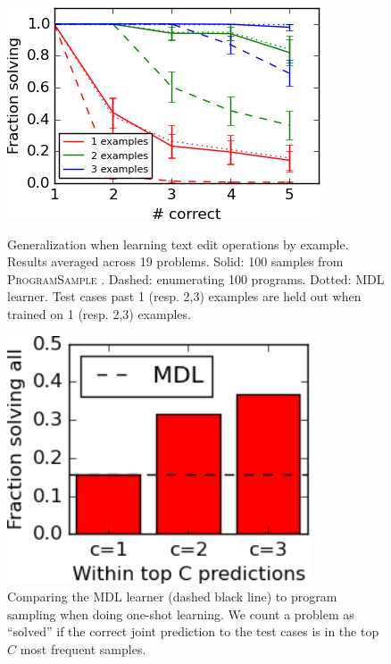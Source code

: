 \documentclass{article}
\newcommand{\theSystem}{\textsc{ProgramSample}}
\begin{document}
\begin{figure}\centering
  \begin{minipage}{0.45\textwidth}
    \includegraphics[width=\textwidth]{smallFractionSolving.png}
  \caption{Generalization when learning text edit operations by example. Results averaged across 19 problems. Solid: 100 samples from \theSystem{} . Dashed: enumerating 100 programs. Dotted: MDL learner. Test cases past 1 (resp. 2,3) examples are held out when trained on 1 (resp. 2,3) examples.}\label{flashPerformance}        \end{minipage}%
\hspace{0.1\textwidth}\begin{minipage}{0.45\textwidth}\centering
    \includegraphics[width=0.8\textwidth]{small_mdl.png}
    \caption{Comparing the MDL learner (dashed black line) to program sampling when doing one-shot learning. We count a problem as ``solved'' if  the correct joint prediction to the test cases is in the top $C$ most frequent samples.}\label{mdl}
  \end{minipage}
 \end{figure}
\end{document}
